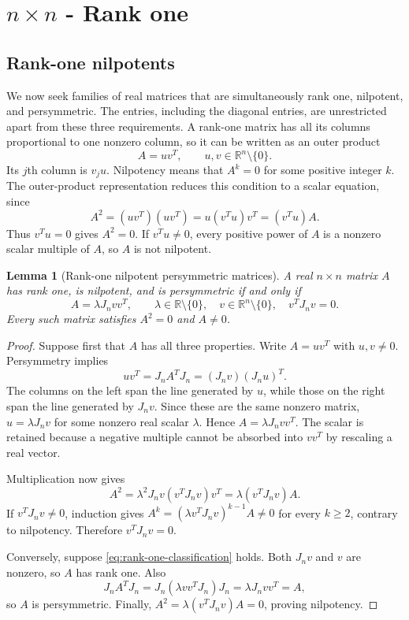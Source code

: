 \documentclass[11pt,a4paper]{article}
\newtheorem{lemma}{Lemma}
\begin{document}
\section{\texorpdfstring{$n\times n$}{General dimension} - Rank one}
\label{sec:dimension-general}
\subsection{Rank-one nilpotents}
\label{sec:rank-one-nilpotent}

We now seek families of real matrices that are simultaneously rank one,
nilpotent, and persymmetric. The entries, including the diagonal entries,
are unrestricted apart from these three requirements. A rank-one matrix
has all its columns proportional to one nonzero column, so it can be
written as an outer product
\[
 A=uv^T,\qquad u,v\in\mathbb R^n\setminus\{0\}.
\]
Its $j$th column is $v_j u$. Nilpotency means that $A^k=0$ for some
positive integer $k$. The outer-product representation reduces this
condition to a scalar equation, since
\[
 A^2=(uv^T)(uv^T)=u(v^Tu)v^T=(v^Tu)A.
\]
Thus $v^Tu=0$ gives $A^2=0$. If $v^Tu\neq0$, every positive power
of $A$ is a nonzero scalar multiple of $A$, so $A$ is not nilpotent.

\begin{lemma}[Rank-one nilpotent persymmetric matrices]
\label{lem:rank-one-nilpotent}
A real $n\times n$ matrix $A$ has rank one, is nilpotent, and is
persymmetric if and only if
\begin{equation}\label{eq:rank-one-classification}
 \boxed{A=\lambda J_nvv^T,\qquad
 \lambda\in\mathbb R\setminus\{0\},\quad
 v\in\mathbb R^n\setminus\{0\},\quad v^TJ_nv=0.}
\end{equation}
Every such matrix satisfies $A^2=0$ and $A\neq0$.
\end{lemma}
\begin{proof}
Suppose first that $A$ has all three properties. Write $A=uv^T$ with
$u,v\neq0$. Persymmetry implies
\[
 uv^T=J_nA^TJ_n=(J_nv)(J_nu)^T.
\]
The columns on the left span the line generated by $u$, while those on
the right span the line generated by $J_nv$. Since these are the same
nonzero matrix, $u=\lambda J_nv$ for some nonzero real scalar $\lambda$.
Hence $A=\lambda J_nvv^T$. The scalar is retained because a negative
multiple cannot be absorbed into $vv^T$ by rescaling a real vector.

Multiplication now gives
\[
 A^2=\lambda^2J_nv(v^TJ_nv)v^T
     =\lambda(v^TJ_nv)A.
\]
If $v^TJ_nv\neq0$, induction gives
$A^k=(\lambda v^TJ_nv)^{k-1}A\neq0$ for every $k\geq2$,
contrary to nilpotency. Therefore $v^TJ_nv=0$.

Conversely, suppose \eqref{eq:rank-one-classification} holds.
Both $J_nv$ and $v$ are nonzero, so $A$ has rank one. Also
\[
 J_nA^TJ_n=J_n(\lambda vv^TJ_n)J_n
            =\lambda J_nvv^T=A,
\]
so $A$ is persymmetric. Finally,
$A^2=\lambda(v^TJ_nv)A=0$, proving nilpotency.
\end{proof}
\end{document}
